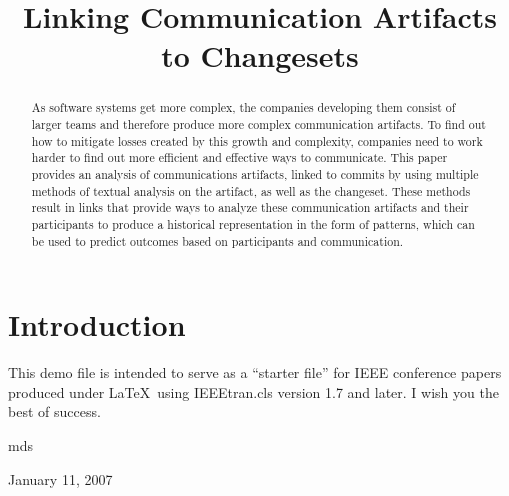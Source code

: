 \documentclass[conference]{IEEEtran}
\begin{document}
\title{Linking Communication Artifacts to Changesets}

\author{
\and
{}
\and
{}
}

\maketitle

\begin{abstract}
As software systems get more complex, the companies developing them consist of larger teams and therefore produce more complex communication artifacts.  To find out how to mitigate losses created by this growth and complexity, companies need to work harder to find out more efficient and effective ways to communicate.  This paper provides an analysis of communications artifacts, linked to commits by using multiple methods of textual analysis on the artifact, as well as the changeset.  These methods result in links that provide ways to analyze these communication artifacts and their participants to produce a historical representation in the form of patterns, which can be used to predict outcomes based on participants and communication.
\end{abstract}


\section{Introduction}
This demo file is intended to serve as a ``starter file''
for IEEE conference papers produced under \LaTeX\ using
IEEEtran.cls version 1.7 and later.
I wish you the best of success.

\hfill mds
 
\hfill January 11, 2007
\end{document}
